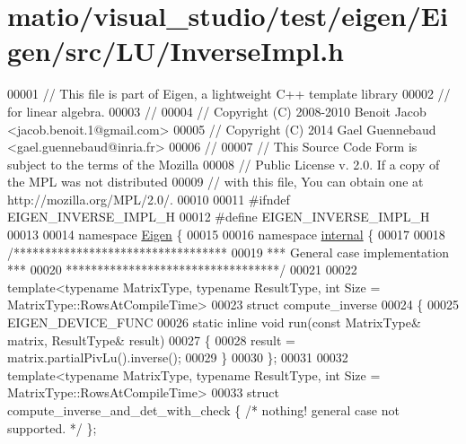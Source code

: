 \hypertarget{matio_2visual__studio_2test_2eigen_2_eigen_2src_2_l_u_2_inverse_impl_8h_source}{}\section{matio/visual\+\_\+studio/test/eigen/\+Eigen/src/\+L\+U/\+Inverse\+Impl.h}
\label{matio_2visual__studio_2test_2eigen_2_eigen_2src_2_l_u_2_inverse_impl_8h_source}

\begin{DoxyCode}
00001 \textcolor{comment}{// This file is part of Eigen, a lightweight C++ template library}
00002 \textcolor{comment}{// for linear algebra.}
00003 \textcolor{comment}{//}
00004 \textcolor{comment}{// Copyright (C) 2008-2010 Benoit Jacob <jacob.benoit.1@gmail.com>}
00005 \textcolor{comment}{// Copyright (C) 2014 Gael Guennebaud <gael.guennebaud@inria.fr>}
00006 \textcolor{comment}{//}
00007 \textcolor{comment}{// This Source Code Form is subject to the terms of the Mozilla}
00008 \textcolor{comment}{// Public License v. 2.0. If a copy of the MPL was not distributed}
00009 \textcolor{comment}{// with this file, You can obtain one at http://mozilla.org/MPL/2.0/.}
00010 
00011 \textcolor{preprocessor}{#ifndef EIGEN\_INVERSE\_IMPL\_H}
00012 \textcolor{preprocessor}{#define EIGEN\_INVERSE\_IMPL\_H}
00013 
00014 \textcolor{keyword}{namespace }\hyperlink{namespace_eigen}{Eigen} \{ 
00015 
00016 \textcolor{keyword}{namespace }\hyperlink{namespaceinternal}{internal} \{
00017 
00018 \textcolor{comment}{/**********************************}
00019 \textcolor{comment}{*** General case implementation ***}
00020 \textcolor{comment}{**********************************/}
00021 
00022 \textcolor{keyword}{template}<\textcolor{keyword}{typename} MatrixType, \textcolor{keyword}{typename} ResultType, \textcolor{keywordtype}{int} Size = MatrixType::RowsAtCompileTime>
00023 \textcolor{keyword}{struct }compute\_inverse
00024 \{
00025   EIGEN\_DEVICE\_FUNC
00026   \textcolor{keyword}{static} \textcolor{keyword}{inline} \textcolor{keywordtype}{void} run(\textcolor{keyword}{const} MatrixType& matrix, ResultType& result)
00027   \{
00028     result = matrix.partialPivLu().inverse();
00029   \}
00030 \};
00031 
00032 \textcolor{keyword}{template}<\textcolor{keyword}{typename} MatrixType, \textcolor{keyword}{typename} ResultType, \textcolor{keywordtype}{int} Size = MatrixType::RowsAtCompileTime>
00033 \textcolor{keyword}{struct }compute\_inverse\_and\_det\_with\_check \{ \textcolor{comment}{/* nothing! general case not supported. */} \};

\end{DoxyCode}
